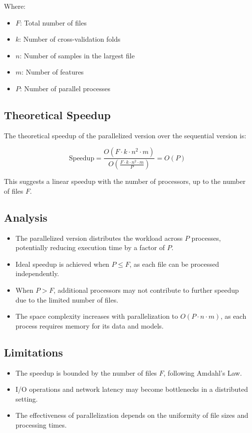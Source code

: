 \documentclass[11pt,a4paper]{article}
\begin{document}
Where:
\begin{itemize}
    \item $F$: Total number of files
    \item $k$: Number of cross-validation folds
    \item $n$: Number of samples in the largest file
    \item $m$: Number of features
    \item $P$: Number of parallel processes
\end{itemize}

\subsection{Theoretical Speedup}
The theoretical speedup of the parallelized version over the sequential version is:

\[ \text{Speedup} = \frac{O(F \cdot k \cdot n^2 \cdot m)}{O(\frac{F \cdot k \cdot n^2 \cdot m}{P})} = O(P) \]

This suggests a linear speedup with the number of processors, up to the number of files $F$.

\subsection{Analysis}
\begin{itemize}
    \item The parallelized version distributes the workload across $P$ processes, potentially reducing execution time by a factor of $P$.
    \item Ideal speedup is achieved when $P \leq F$, as each file can be processed independently.
    \item When $P > F$, additional processors may not contribute to further speedup due to the limited number of files.
    \item The space complexity increases with parallelization to $O(P \cdot n \cdot m)$, as each process requires memory for its data and models.
\end{itemize}

\subsection{Limitations}
\begin{itemize}
    \item The speedup is bounded by the number of files $F$, following Amdahl's Law.
    \item I/O operations and network latency may become bottlenecks in a distributed setting.
    \item The effectiveness of parallelization depends on the uniformity of file sizes and processing times.
\end{itemize}
\end{document}
